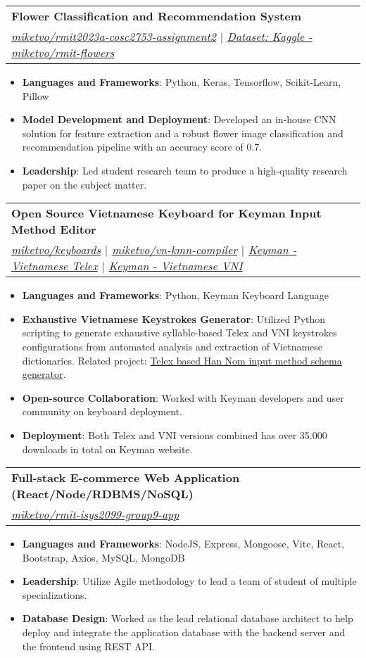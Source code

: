 \documentclass[a4paper,11pt]{article}
\makeatletter
\newcommand{\resumeItem}[2]{
  \item\small{
    \textbf{#1}{: #2 \vspace{-2pt}}
  }
}
\newcommand{\resumeSubheading}[4]{
  \vspace{-1pt}\item
    \begin{tabular*}{0.97\textwidth}{l@{\extracolsep{\fill}}r}
      \textbf{#1} & #2 \\
      \textit{\small#3} & \textit{\small #4} \\
    \end{tabular*}\vspace{-5pt}
}
\newcommand{\resumeItemListStart}{\begin{itemize}}
\newcommand{\resumeItemListEnd}{\end{itemize}\vspace{-5pt}}
\makeatother
\begin{document}
    \resumeSubheading
      {Flower Classification and Recommendation System}{}
      {\href{https://github.com/miketvo/rmit2023a-cosc2753-assignment2}{\faGithub\space miketvo/rmit2023a-cosc2753-assignment2} $|$ \href{https://www.kaggle.com/datasets/miketvo/rmit-flowers/}{\faDatabase\space Dataset: Kaggle - miketvo/rmit-flowers}}{}
      \resumeItemListStart
        \resumeItem{Languages and Frameworks}
          {Python, Keras, Tensorflow, Scikit-Learn, Pillow}
        \resumeItem{Model Development and Deployment}
          {Developed an in-house CNN solution for feature extraction and a robust flower image classification and recommendation pipeline with an accuracy score of 0.7.}
        \resumeItem{Leadership}
          {Led student research team to produce a high-quality research paper on the subject matter.}
      \resumeItemListEnd

    \resumeSubheading
      {Open Source Vietnamese Keyboard for Keyman Input Method Editor}{}
      {\href{https://github.com/miketvo/keyboards}{\faGithub\space miketvo/keyboards} $|$ \href{https://github.com/miketvo/vn-kmn-compiler}{\faGithub\space miketvo/vn-kmn-compiler} $|$ \href{https://keyman.com/keyboards/vietnamese_telex}{\faGlobe\space Keyman - Vietnamese Telex} $|$ \href{https://keyman.com/keyboards/vietnamese_vni}{\faGlobe\space Keyman - Vietnamese VNI}}{}
      \resumeItemListStart
        \resumeItem{Languages and Frameworks}
          {Python, Keyman Keyboard Language}
        \resumeItem{Exhaustive Vietnamese Keystrokes Generator}
          {Utilized Python scripting to generate exhaustive syllable-based Telex and VNI keystrokes configurations from automated analysis and extraction of Vietnamese dictionaries. Related project: \href{https://github.com/miketvo/rime-ime-han-nom-data}{\faGithub\space Telex based Han Nom input method schema generator}.}
        \resumeItem{Open-source Collaboration}
          {Worked with Keyman developers and user community on keyboard deployment.}
        \resumeItem{Deployment}
          {Both Telex and VNI versions combined has over 35.000 downloads in total on Keyman website.}
      \resumeItemListEnd

    \resumeSubheading
      {Full-stack E-commerce Web Application (React/Node/RDBMS/NoSQL)}{}
      {\href{https://github.com/miketvo/rmit-isys2099-group9-app}{\faGithub\space miketvo/rmit-isys2099-group9-app}}{}
      \resumeItemListStart
        \resumeItem{Languages and Frameworks}
          {NodeJS, Express, Mongoose, Vite, React, Bootstrap, Axios, MySQL, MongoDB}
        \resumeItem{Leadership}
          {Utilize Agile methodology to lead a team of student of multiple specializations.}
        \resumeItem{Database Design}
          {Worked as the lead relational database architect to help deploy and integrate the application database with the backend server and the frontend using REST API.} 
      \resumeItemListEnd
  
\end{document}
